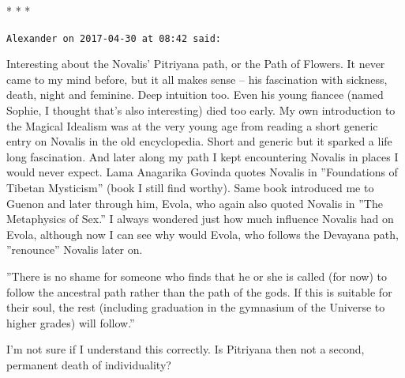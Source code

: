 \begin{center}* * *\end{center}

\begin{footnotesize}
\begin{sffamily}
\texttt{Alexander on 2017-04-30 at 08:42 said:}

Interesting about the Novalis' Pitriyana path, or the Path of Flowers. It never came to my mind before, but it all makes sense -- his fascination with sickness, death, night and feminine. Deep intuition too. Even his young fiancee (named Sophie, I thought that's also interesting) died too early. My own introduction to the Magical Idealism was at the very young age from reading a short generic entry on Novalis in the old encyclopedia. Short and generic but it sparked a life long fascination. And later along my path I kept encountering Novalis in places I would never expect. Lama Anagarika Govinda quotes Novalis in ''Foundations of Tibetan Mysticism'' (book I still find worthy). Same book introduced me to Guenon and later through him, Evola, who again also quoted Novalis in ''The Metaphysics of Sex.'' I always wondered just how much influence Novalis had on Evola, although now I can see why would Evola, who follows the Devayana path, ''renounce'' Novalis later on.

''There is no shame for someone who finds that he or she is called (for now) to follow the ancestral path rather than the path of the gods. If this is suitable for their soul, the rest (including graduation in the gymnasium of the Universe to higher grades) will follow.''

I'm not sure if I understand this correctly. Is Pitriyana then not a second, permanent death of individuality?


\hfill

\end{sffamily}
\end{footnotesize}


